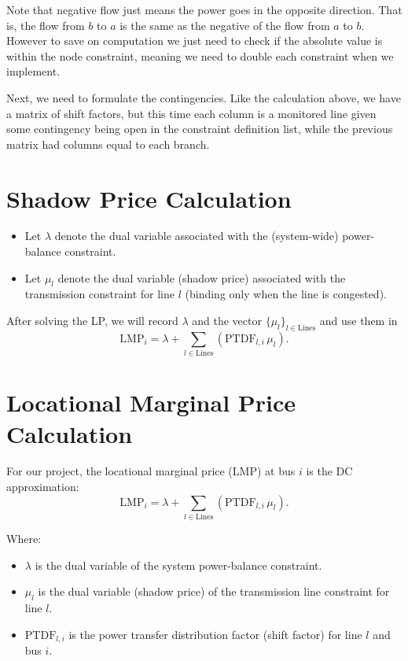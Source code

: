 \documentclass[11pt]{article}
\begin{document}
Note that negative flow just means the power goes in the opposite direction. That is, the flow from $b$ to $a$ is the same as the negative of the flow from $a$ to $b$. However to save on computation we just need to check if the absolute value is within the node constraint, meaning we need to double each constraint when we implement.

Next, we need to formulate the contingencies. Like the calculation above, we have a matrix of shift factors, but this time each column is a monitored line given some contingency being open in the constraint definition list, while the previous matrix had columns equal to each branch.

\section{Shadow Price Calculation}

\begin{itemize}
  \item Let $\lambda$ denote the dual variable associated with the (system-wide) power-balance constraint.
  \item Let $\mu_l$ denote the dual variable (shadow price) associated with the transmission constraint for line $l$ (binding only when the line is congested).
\end{itemize}
After solving the LP, we will record $\lambda$ and the vector $\{\mu_l\}_{l\in\text{Lines}}$ and use them in
\[
  \mathrm{LMP}_i = \lambda + \sum_{l\in\text{Lines}} \left(\mathrm{PTDF}_{l,i}\,\mu_l\right).
\]

\section{Locational Marginal Price Calculation}

For our project, the locational marginal price (LMP) at bus $i$ is the DC approximation:
\[
  \mathrm{LMP}_i = \lambda + \sum_{l\in\text{Lines}} \left(\mathrm{PTDF}_{l,i}\,\mu_l\right).
\]

\noindent
Where:
\begin{itemize}
  \item $\lambda$ is the dual variable of the system power-balance constraint.
  \item $\mu_l$ is the dual variable (shadow price) of the transmission line constraint for line $l$.
  \item $\mathrm{PTDF}_{l,i}$ is the power transfer distribution factor (shift factor) for line $l$ and bus $i$.
\end{itemize}
\end{document}
